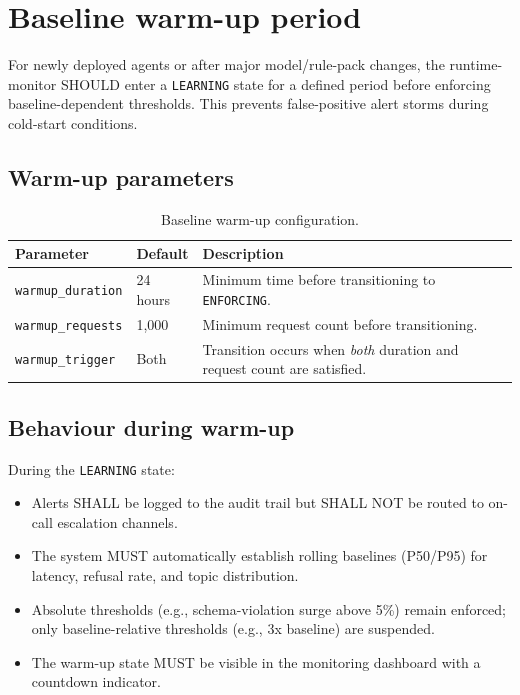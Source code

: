 \section{Baseline warm-up period}
\label{sec:baseline-warmup}

For newly deployed agents or after major model/rule-pack changes, the
runtime-monitor SHOULD enter a \texttt{LEARNING} state for a defined
period before enforcing baseline-dependent thresholds. This prevents
false-positive alert storms during cold-start conditions.

\subsection{Warm-up parameters}

\begin{table}[htbp]
\centering
\footnotesize
\caption{Baseline warm-up configuration.}
\label{tab:warmup-config}
\begin{tabularx}{\textwidth}{@{}l l X@{}}
\toprule
\textbf{Parameter} & \textbf{Default} & \textbf{Description} \\
\midrule
\texttt{warmup\_duration} & 24 hours & Minimum time before transitioning to \texttt{ENFORCING}. \\
\texttt{warmup\_requests} & 1{,}000 & Minimum request count before transitioning. \\
\texttt{warmup\_trigger} & Both & Transition occurs when \emph{both} duration and request count are satisfied. \\
\bottomrule
\end{tabularx}
\end{table}

\subsection{Behaviour during warm-up}

During the \texttt{LEARNING} state:
\begin{itemize}
  \item Alerts SHALL be logged to the audit trail but SHALL NOT be
    routed to on-call escalation channels.
  \item The system MUST automatically establish rolling baselines
    (P50/P95) for latency, refusal rate, and topic distribution.
  \item Absolute thresholds (e.g., schema-violation surge above 5\%)
    remain enforced; only baseline-relative thresholds (e.g., 3x
    baseline) are suspended.
  \item The warm-up state MUST be visible in the monitoring dashboard
    with a countdown indicator.
\end{itemize}

